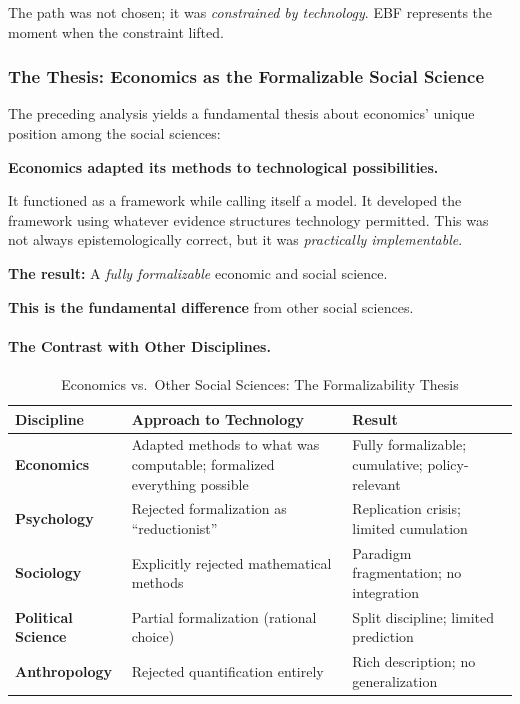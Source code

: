 The path was not chosen; it was \textit{constrained by technology}.
EBF represents the moment when the constraint lifted.

\subsubsection{The Thesis: Economics as the Formalizable Social Science}

The preceding analysis yields a fundamental thesis about economics' unique position
among the social sciences:

\begin{tcolorbox}[colback=blue!5!white, colframe=blue!75!black,
    title=\textbf{The Central Thesis}]

\textbf{Economics adapted its methods to technological possibilities.}

It functioned as a framework while calling itself a model. It developed the
framework using whatever evidence structures technology permitted. This was
not always epistemologically correct, but it was \textit{practically implementable}.

\textbf{The result:} A \textit{fully formalizable} economic and social science.

\textbf{This is the fundamental difference} from other social sciences.
\end{tcolorbox}

\paragraph{The Contrast with Other Disciplines.}

\begin{table}[htbp]
\centering
\caption{Economics vs.\ Other Social Sciences: The Formalizability Thesis}
\label{tab:formalizability}
\renewcommand{\arraystretch}{1.3}
\small
\begin{tabular}{@{}p{3cm}p{4.5cm}p{4.5cm}@{}}
\toprule
\textbf{Discipline} & \textbf{Approach to Technology} & \textbf{Result} \\
\midrule
\textbf{Economics} &
    Adapted methods to what was computable; formalized everything possible &
    Fully formalizable; cumulative; policy-relevant \\
\textbf{Psychology} &
    Rejected formalization as ``reductionist'' &
    Replication crisis; limited cumulation \\
\textbf{Sociology} &
    Explicitly rejected mathematical methods &
    Paradigm fragmentation; no integration \\
\textbf{Political Science} &
    Partial formalization (rational choice) &
    Split discipline; limited prediction \\
\textbf{Anthropology} &
    Rejected quantification entirely &
    Rich description; no generalization \\
\bottomrule
\end{tabular}
\end{table}

